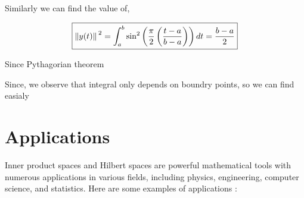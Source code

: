 \documentclass[12pt, a4paper]{article} %
\begin{document}
    Similarly we can find the value of,

    \begin{align*}
        \boxed{\norm*{y(t)}^2 = \int_{a}^{b} \sin^2\left(\frac{\pi}{2}\left(\frac{t-a}{b-a}\right)\right) dt  = \frac{b-a}{2}}
    \end{align*}


    Since Pythagorian theorem
   


    Since, we observe that integral only depends on boundry points, so we can find easialy
    
    \section{Applications}

    Inner product spaces and Hilbert spaces are powerful mathematical tools with numerous 
    \newline 
    applications in various fields, including physics, engineering, computer science, and statistics. Here are some examples of applications :
\end{document}
